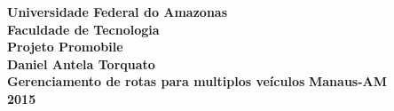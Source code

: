 \thispagestyle{empty}

{\centering
{\sc 
\textbf{
Universidade Federal do Amazonas \\
Faculdade de Tecnologia\\
Projeto Promobile\\[4cm]
Daniel Antela Torquato\\[4cm]
Gerenciamento de rotas para multiplos veículos}}
\vfill
{\bf Manaus-AM\\2015\\}
}
